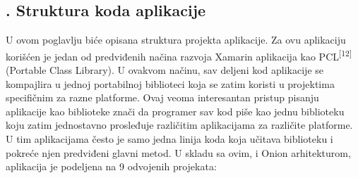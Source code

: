 \documentclass[a4paper]{article}
\begin{document}
\subsection[7.2. Struktura koda aplikacije]{. Struktura
koda aplikacije}
\hypertarget{RefHeadingToc4271813786090}{}U ovom poglavlju biće opisana
struktura projekta aplikacije. Za ovu aplikaciju korišćen je jedan od
predviđenih načina razvoja Xamarin aplikacija kao
PCL\textsuperscript{[12]} (Portable Class Library). U ovakvom načinu,
sav deljeni kod aplikacije se kompajlira u jednoj portabilnoj
biblioteci koja se zatim koristi u projektima specifičnim za razne
platforme. Ovaj veoma interesantan pristup pisanju aplikacije kao
biblioteke znači da programer sav kod piše kao jednu biblioteku koju
zatim jednostavno prosleđuje različitim aplikacijama za različite
platforme. U tim aplikacijama često je samo jedna linija koda koja
učitava biblioteku i pokreće njen predviđeni glavni metod. U skladu sa
ovim, i Onion arhitekturom, aplikacija je podeljena na 9 odvojenih
projekata:
\end{document}
